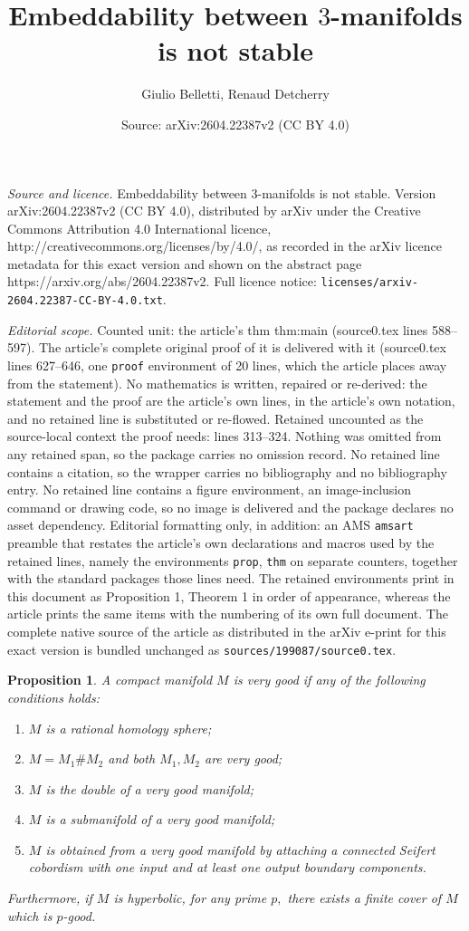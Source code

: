 \documentclass[10pt,a4paper]{amsart}
\title{Embeddability between $3$-manifolds is not stable}
\author{Giulio Belletti, Renaud Detcherry}
\date{Source: arXiv:2604.22387v2 (CC BY 4.0)}
\newtheorem{prop}{Proposition}
\begin{document}
\maketitle

\noindent\emph{Source and licence.} Embeddability between $3$-manifolds is not stable. Version arXiv:2604.22387v2 (CC BY 4.0), distributed by arXiv under the Creative Commons Attribution 4.0 International licence, http://creativecommons.org/licenses/by/4.0/, as recorded in the arXiv licence metadata for this exact version and shown on the abstract page https://arxiv.org/abs/2604.22387v2. Full licence notice: \texttt{licenses/arxiv-2604.22387-CC-BY-4.0.txt}.\par\smallskip

\noindent\textit{Editorial scope.} Counted unit: the article's thm thm:main (source0.tex lines 588--597). The article's complete original proof of it is delivered with it (source0.tex lines 627--646, one \texttt{proof} environment of 20 lines, which the article places away from the statement). No mathematics is written, repaired or re-derived: the statement and the proof are the article's own lines, in the article's own notation, and no retained line is substituted or re-flowed.  Retained uncounted as the source-local context the proof needs: lines 313--324.  Nothing was omitted from any retained span, so the package carries no omission record.  No retained line contains a citation, so the wrapper carries no bibliography and no bibliography entry.  No retained line contains a figure environment, an image-inclusion command or drawing code, so no image is delivered and the package declares no asset dependency.  Editorial formatting only, in addition: an AMS \texttt{amsart} preamble that restates the article's own declarations and macros used by the retained lines, namely the environments \texttt{prop}, \texttt{thm} on separate counters, together with the standard packages those lines need.  The retained environments print in this document as Proposition 1, Theorem 1 in order of appearance, whereas the article prints the same items with the numbering of its own full document.  The complete native source of the article as distributed in the arXiv e-print for this exact version is bundled unchanged as \texttt{sources/199087/source0.tex}.
\begin{prop}\label{prop:VeryGood}
	A compact manifold $M$ is very good if any of the following conditions holds:
	\begin{enumerate}
		\item $M$ is a rational homology sphere;
		\item $M=M_1\# M_2$ and both $M_1,M_2$ are very good;
		\item $M$ is the double of a very good manifold;
		\item $M$ is a submanifold of a very good manifold; 
		\item $M$ is obtained from a very good manifold by attaching a connected Seifert cobordism with one input and at least one output boundary components.
	\end{enumerate}
	
	Furthermore, if $M$ is hyperbolic, for any prime $p,$ there exists a finite cover of $M$ which is $p$-good.
\end{prop}
\end{document}
